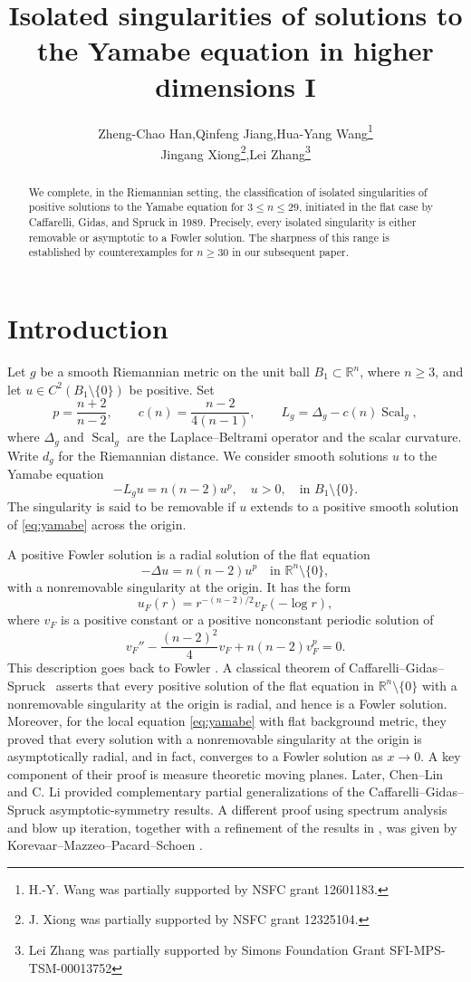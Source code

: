 \documentclass[11pt]{article}
\title{\bfseries Isolated singularities of solutions to the Yamabe equation in higher dimensions I}
\author{Zheng-Chao Han,\quad Qinfeng Jiang,\quad Hua-Yang Wang\thanks{H.-Y. Wang was partially supported by NSFC grant 12601183.}\\[2mm]
Jingang Xiong\thanks{J. Xiong was partially supported by NSFC grant 12325104.},\quad Lei Zhang\thanks{Lei Zhang was partially supported by Simons Foundation Grant SFI-MPS-TSM-00013752 }}
\date{}
\numberwithin{equation}{section}
\theoremstyle{remark}
\newcommand{\R}{\mathbb R}
\begin{document}
\maketitle
\begin{abstract}
We complete, in the Riemannian setting, the classification of isolated
singularities of positive solutions to the Yamabe equation for
\(3\le n\le29\), initiated in the flat case by Caffarelli, Gidas, and
Spruck in 1989. Precisely, every isolated singularity is either removable
or asymptotic to a Fowler solution. The sharpness of this range is
established by counterexamples for \(n\ge30\) in our subsequent paper. 
\end{abstract}
\setcounter{tocdepth}{1}
\tableofcontents
\clearpage

\section{Introduction}

Let \(g\) be a smooth Riemannian metric on the unit ball
\(B_1\subset\R^n\), where \(n\ge3\), and let
\(u\in C^2(B_1\setminus\{0\})\) be positive. Set
\[
 p=\frac{n+2}{n-2},\qquad
 c(n)=\frac{n-2}{4(n-1)},\qquad
 L_g=\Delta_g-c(n)\operatorname{Scal}_g,
\]
where \(\Delta_g\) and \(\operatorname{Scal}_g\) are the Laplace--Beltrami operator and
the scalar curvature. Write \(d_g\) for the Riemannian distance.
We consider smooth solutions $u$ to the Yamabe equation
\begin{equation}\label{eq:yamabe}
 -L_gu=n(n-2)u^p, \quad u>0,
 \quad\text{in }B_1\setminus\{0\}.
\end{equation}
The singularity is said to be removable
if \(u\) extends to a positive smooth solution of \eqref{eq:yamabe}
across the origin.

A positive Fowler solution is a radial solution of the flat equation
\[
 -\Delta u=n(n-2)u^p
 \quad\text{in }\R^n\setminus\{0\},
\]
with a nonremovable singularity at the origin. It has the form
\[
 u_F(r)=r^{-(n-2)/2}v_F(-\log r),
\]
where \(v_F\) is a positive constant or a positive nonconstant periodic
solution of
\begin{equation}\label{eq:fowler-ode}
 v_F''-\frac{(n-2)^2}{4}v_F+n(n-2)v_F^p=0.
\end{equation}
This description goes back to Fowler  \cite{F}. 
A classical theorem of  Caffarelli--Gidas--Spruck~\cite{CGS} asserts that every positive solution of the flat equation in $\R^n\setminus\{0\}$ with a nonremovable singularity at the origin is radial, and hence is a Fowler solution.  Moreover, for the local equation \eqref{eq:yamabe} with flat background metric, they proved that every solution with a nonremovable singularity at the origin is asymptotically radial, and in fact, converges to a Fowler solution as $x\to 0$. A key component of their proof is measure theoretic moving planes. Later, Chen--Lin \cite{ChenLin1995} and C. Li \cite{Lc} provided complementary partial generalizations of the Caffarelli--Gidas--Spruck asymptotic-symmetry results. A different proof using spectrum analysis and blow up iteration, together with a refinement of the results in \cite{CGS}, was given by Korevaar--Mazzeo--Pacard--Schoen \cite{KMPS}. 
\end{document}
